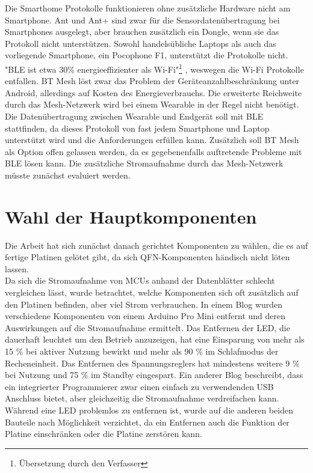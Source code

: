 Die Smarthome Protokolle funktionieren ohne zusätzliche Hardware nicht am Smartphone.
Ant und Ant+ sind zwar für die Sensordatenübertragung bei Smartphones ausgelegt, aber brauchen zusätzlich ein Dongle, wenn sie das Protokoll nicht unterstützen.
Sowohl handelsübliche Laptops als auch das vorliegende Smartphone, ein Pocophone F1, unterstützt die Protokolle nicht.\\
"BLE ist etwa 30\% energieeffizienter als Wi-Fi"\footnote{Übersetzung durch den Verfasser} \cite{comparison_wifi_ble}, weswegen die Wi-Fi Protokolle entfallen.
BT Mesh löst zwar das Problem der Geräteanzahlbeschränkung unter Android, allerdings auf Kosten des Energieverbrauchs.
Die erweiterte Reichweite durch das Mesh-Netzwerk wird bei einem Wearable in der Regel nicht benötigt.\\
Die Datenübertragung zwischen Wearable und Endgerät soll mit BLE stattfinden, da dieses Protokoll von fast jedem Smartphone und Laptop unterstützt wird und die Anforderungen erfüllen kann.
Zusätzlich soll BT Mesh als Option offen gelassen werden, da es gegebenenfalls auftretende Probleme mit BLE lösen kann.
Die zusätzliche Stromaufnahme durch das Mesh-Netzwerk müsste zunächst evaluiert werden.

\section{Wahl der Hauptkomponenten}
Die Arbeit hat sich zunächst danach gerichtet Komponenten zu wählen, die es auf fertige Platinen gelötet gibt, da sich QFN-Komponenten händisch nicht löten lassen.\\
Da sich die Stromaufnahme von MCUs anhand der Datenblätter schlecht vergleichen lässt, wurde betrachtet, welche Komponenten sich oft zusätzlich auf den Platinen befinden, aber viel Strom verbrauchen.
In einem Blog \cite{site_arduinolp} wurden verschiedene Komponenten von einem Arduino Pro Mini entfernt und deren Auswirkungen auf die Stromaufnahme ermittelt.
Das Entfernen der LED, die dauerhaft leuchtet um den Betrieb anzuzeigen, hat eine Einsparung von mehr als 15 \% bei aktiver Nutzung bewirkt und mehr als 90 \% im Schlafmodus der Recheneinheit.
Das Entfernen des Spannungsreglers hat mindestens weitere 9 \% bei Nutzung und 75 \% im Standby eingespart.
Ein anderer Blog \cite{site_arduinolp2} beschreibt, dass ein integrierter Programmierer zwar einen einfach zu verwendenden USB Anschluss bietet, aber gleichzeitig die Stromaufnahme verdreifachen kann.
Während eine LED problemlos zu entfernen ist, wurde auf die anderen beiden Bauteile nach Möglichkeit verzichtet, da ein Entfernen auch die Funktion der Platine einschränken oder die Platine zerstören kann.

